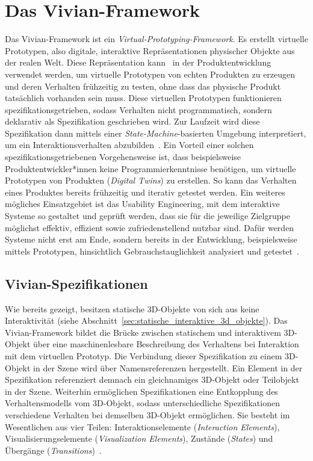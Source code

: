 \pagebreak
\section{Das Vivian-Framework}\label{sec:vivian_framework}

Das Vivian-Framework ist ein \textit{Virtual-Prototyping-Framework}.
Es erstellt virtuelle Prototypen, also digitale, interaktive Repräsentationen physischer Objekte aus der realen Welt.
Diese Repräsentation kann \zB~in der Produktentwicklung verwendet werden, um virtuelle Prototypen von echten Produkten zu erzeugen und deren Verhalten frühzeitig zu testen, ohne dass das physische Produkt tatsächlich vorhanden sein muss.
Diese virtuellen Prototypen funktionieren spezifikationsgetrieben, sodass Verhalten nicht programmatisch, sondern deklarativ als Spezifikation geschrieben wird.
Zur Laufzeit wird diese Spezifikation dann mittels einer \textit{State-Machine}-basierten Umgebung interpretiert, um ein Interaktionsverhalten abzubilden~\cite{VivianFrameworkGitLab2021}.
Ein Vorteil einer solchen spezifikationsgetriebenen Vorgehensweise ist, dass beispielsweise Produktentwickler*innen keine Programmierkenntnisse benötigen, um virtuelle Prototypen von Produkten (\textit{Digital Twins}) zu erstellen.
So kann das Verhalten eines Produktes bereits frühzeitig und iterativ getestet werden.
Ein weiteres mögliches Einsatzgebiet ist das Usability Engineering, mit dem interaktive Systeme so gestaltet und geprüft werden, dass sie für die jeweilige Zielgruppe möglichst effektiv, effizient sowie zufriedenstellend nutzbar sind.
Dafür werden Systeme nicht erst am Ende, sondern bereits in der Entwicklung, beispielsweise mittels Prototypen, hinsichtlich Gebrauchstauglichkeit analysiert und getestet~\cite{gouldDesigningUsabilityKey1985}.

\subsection*{Vivian-Spezifikationen}

Wie bereits gezeigt, besitzen statische 3D-Objekte von sich aus keine Interaktivität (siehe Abschnitt~\ref{sec:statische_interaktive_3d_objekte}).
Das Vivian-Framework bildet die Brücke zwischen statischem und interaktivem 3D-Objekt über eine maschinenlesbare Beschreibung des Verhaltens bei Interaktion mit dem virtuellen Prototyp.
Die Verbindung dieser Spezifikation zu einem 3D-Objekt in der Szene wird über Namensreferenzen hergestellt. %
Ein Element in der Spezifikation referenziert demnach ein gleichnamiges 3D-Objekt oder Teilobjekt in der Szene.
Weiterhin ermöglichen Spezifikationen eine Entkopplung des Verhaltensmodells vom 3D-Objekt, sodass unterschiedliche Spezifikationen verschiedene Verhalten bei demselben 3D-Objekt ermöglichen.
Sie besteht im Wesentlichen aus vier Teilen: Interaktionselemente (\textit{Interaction Elements}), Visualisierungselemente (\textit{Visualization Elements}), Zustände (\textit{States}) und Übergänge (\textit{Transitions})~\cite{VivianFrameworkGitLab2021}.

